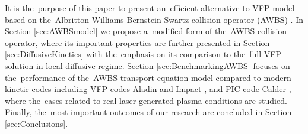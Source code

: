

It is the~purpose of this paper to present an~efficient alternative 
to VFP model based on the~Albritton-Williams-Bernstein-Swartz 
collision operator (AWBS) \cite{AWBS_PRL1986}.
In Section \ref{sec:AWBSmodel} we propose a~modified form of 
the~AWBS collision operator, where its important properties are further
presented in Section \ref{sec:DiffusiveKinetics} with the~emphasis on its
comparison to the~full VFP solution in local diffusive regime. 
Section \ref{sec:BenchmarkingAWBS} focuses on the~performance of the~AWBS 
transport equation model compared to modern kinetic codes including VFP codes
Aladin and Impact \cite{Kingham_JCP2004}, and PIC code Calder 
\cite{Perez_PoP2012}, where the~cases related to real
laser generated plasma conditions are studied. Finally, the~most important
outcomes of our research are concluded in Section \ref{sec:Conclusions}. 
